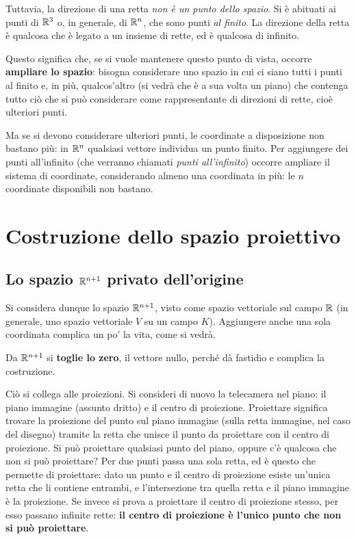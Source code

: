 Tuttavia, la direzione di una retta \emph{non è un punto dello spazio}. Si è abituati ai punti di $\mathbb{R}^3$ o, in generale, di $\mathbb{R}^n$, che sono punti \emph{al finito}. La direzione della retta è qualcosa che è legato a un insieme di rette, ed è qualcosa di infinito.

Questo significa che, se si vuole mantenere questo punto di vista, occorre \textbf{ampliare lo spazio}: bisogna considerare uno spazio in cui ci siano tutti i punti al finito e, in più, qualcos'altro (si vedrà che è a sua volta un piano) che contenga tutto ciò che si può considerare come rappresentante di direzioni di rette, cioè ulteriori punti.

Ma se si devono considerare ulteriori punti, le coordinate a disposizione non bastano più: in $\mathbb{R}^n$ qualsiasi vettore individua un punto finito. Per aggiungere dei punti all'infinito (che verranno chiamati \emph{punti all'infinito}) occorre ampliare il sistema di coordinate, considerando almeno una coordinata in più: le $n$ coordinate disponibili non bastano.

\section{Costruzione dello spazio proiettivo}

\subsection{Lo spazio $\mathbb{R}^{n+1}$ privato dell'origine}

Si considera dunque lo spazio $\mathbb{R}^{n+1}$, visto come spazio vettoriale sul campo $\mathbb{R}$ (in generale, uno spazio vettoriale $V$ su un campo $K$). Aggiungere anche una sola coordinata complica un po' la vita, come si vedrà.

Da $\mathbb{R}^{n+1}$ si \textbf{toglie lo zero}, il vettore nullo, perché dà fastidio e complica la costruzione.

Ciò si collega alle proiezioni. Si consideri di nuovo la telecamera nel piano: il piano immagine (assunto dritto) e il centro di proiezione. Proiettare significa trovare la proiezione del punto sul piano immagine (sulla retta immagine, nel caso del disegno) tramite la retta che unisce il punto da proiettare con il centro di proiezione. Si può proiettare qualsiasi punto del piano, oppure c'è qualcosa che non si può proiettare? Per due punti passa una sola retta, ed è questo che permette di proiettare: dato un punto e il centro di proiezione esiste un'unica retta che li contiene entrambi, e l'intersezione tra quella retta e il piano immagine è la proiezione. Se invece si prova a proiettare il centro di proiezione stesso, per esso passano infinite rette: \textbf{il centro di proiezione è l'unico punto che non si può proiettare}.

